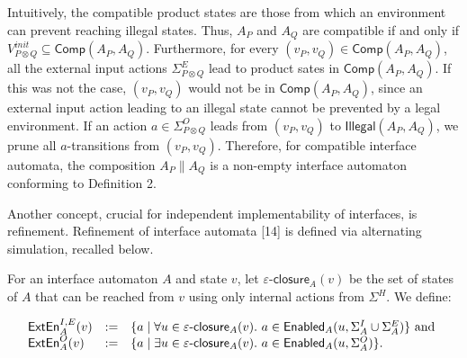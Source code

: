  
 
 
Intuitively, the compatible product states are those from which an environment can prevent reaching illegal states. Thus, $A_{P}$ and $A_{Q}$ are compatible if and only if $V_{P\otimes Q}^{init}\subseteq\mathsf{Comp}(A_{P},A_{Q})$. Furthermore, for every $(v_{P},v_{Q})\in\mathsf{Comp}(A_{P},A_{Q})$, all the external input actions $\Sigma_{P\otimes Q}^{E}$ lead to product sates in $\mathsf{Comp}(A_{P},A_{Q})$. If this was not the case, $(v_{P},v_{Q})$ would not be in $\mathsf{Comp}(A_{P},A_{Q})$, since an external input action leading to an illegal state cannot be prevented by a legal environment. If an action $a\in\Sigma_{P\otimes Q}^{O}$ leads from $(v_{P},v_{Q})$ to $\mathsf{Illegal}(A_{P},A_{Q})$, we prune all $a$-transitions from $(v_{P},v_{Q})$. Therefore, for compatible interface automata, the composition $A_{P}\parallel A_{Q}$ is a non-empty interface automaton conforming to Definition 2.\par
 
 
 
Another concept, crucial for independent implementability of interfaces, is refinement. Refinement of interface automata [14] is defined via alternating simulation, recalled below.\par
 
 
 
For an interface automaton $A$ and state $v$, let $\varepsilon\text{-}\mathsf{closure}_{A}(v)$ be the set of states of $A$ that can be reached from $v$ using only internal actions from $\Sigma^{H}$. We define:\par
  
\par  \quad  \[\begin{array}[]{lll}\mathsf{ExtEn}^{I,E}_{A}(v)&:=&\{a\mid\forall u\in\varepsilon\text{-}\mathsf{closure}_{A}(v).\nobreak\ a\in\mathsf{Enabled}_{A}(u,\Sigma_{A}^{I}\cup\Sigma_{A}^{E})\}\text{ and }\\
\mathsf{ExtEn}^{O}_{A}(v)&:=&\{a\mid\exists u\in\varepsilon\text{-}\mathsf{closure}_{A}(v).\nobreak\ a\in\mathsf{Enabled}_{A}(u,\Sigma_{A}^{O})\}.\end{array}\]\quad  \quad  
  
